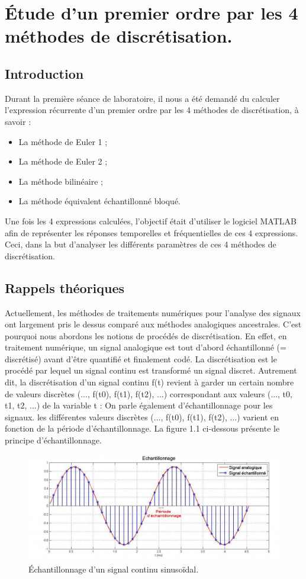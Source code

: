 \chapter{Étude d'un premier ordre par les 4 méthodes de discrétisation.}

\section{Introduction}
Durant la première séance de laboratoire, il nous a été demandé du calculer l'expression récurrente d'un premier ordre par les 4 méthodes de discrétisation, à savoir : 
\begin{itemize}
\item La méthode de Euler 1 ;
\item La méthode de Euler 2 ;
\item La méthode bilinéaire ;
\item La méthode équivalent échantillonné bloqué.
\end{itemize}
Une fois les 4 expressions calculées, l'objectif était d'utiliser le logiciel MATLAB afin de représenter les réponses temporelles et fréquentielles de ces 4 expressions. Ceci, dans la but d'analyser les différents paramètres de ces 4 méthodes de discrétisation.

\section{Rappels théoriques}

Actuellement, les méthodes de traitements numériques pour l'analyse des signaux ont largement pris le dessus comparé aux méthodes analogiques ancestrales. C'est pourquoi nous abordons les notions de procédés de discrétisation. En effet, en traitement numérique, un signal analogique est tout d'abord échantillonné (= discrétisé) avant d'être quantifié et finalement codé. La discrétisation est le procédé par lequel un signal continu est transformé un signal discret. Autrement dit, la discrétisation d'un signal continu f(t) revient à garder un certain nombre de valeurs discrètes (..., f(t0), f(t1), f(t2), ...) correspondant aux valeurs (..., t0, t1, t2, ...) de la variable t : On parle également d'échantillonnage pour les signaux. les différentes valeurs discrètes (..., f(t0), f(t1), f(t2), ...) varient en fonction de la période d'échantillonnage. La figure 1.1 ci-dessous présente le principe d'échantillonnage.
\begin{figure}[!ht]
\centering
	\includegraphics[scale=0.45]{images/echantillonnage.jpg}
	\caption{Échantillonnage d'un signal continu sinusoïdal.}
	\label{fig:échantillonnage}
\end{figure}

